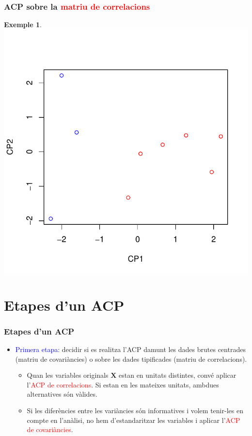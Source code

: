 \documentclass[12pt,t]{beamer}
\newcommand{\red}[1]{\textcolor{red}{#1}}
\newcommand{\blue}[1]{\textcolor{blue}{#1}}
\theoremstyle{plain}
\theoremstyle{definition}
\newtheorem{exemple}{Exemple}
\begin{document}
\begin{frame}
\frametitle{ACP sobre la \red{matriu de correlacions}}
\begin{exemple}
\vspace*{-1cm}

\includegraphics{ACP2print-051}
\end{exemple}
\end{frame}

\section{Etapes d'un ACP}

\begin{frame}
\frametitle{Etapes d'un ACP}
\begin{itemize}
\item \blue{Primera etapa:} decidir si es realitza l'ACP damunt les dades brutes centrades (matriu de covariàncies) o 
sobre les dades tipificades (matriu de correlacions).
\begin{itemize}
\item Quan les variables originals $\mathbf{X}$ estan en unitats distintes, convé aplicar l'\red{ACP de correlacions}. 
Si estan en les mateixes unitats, ambdues alternatives són vàlides.
\item Si les diferències entre les variàncies són informatives i volem tenir-les en compte en l'anàlisi, no hem 
d'estandaritzar les variables i aplicar l'\red{ACP de covariàncies}.
\end{itemize}
\end{itemize}
\end{frame}
\end{document}
